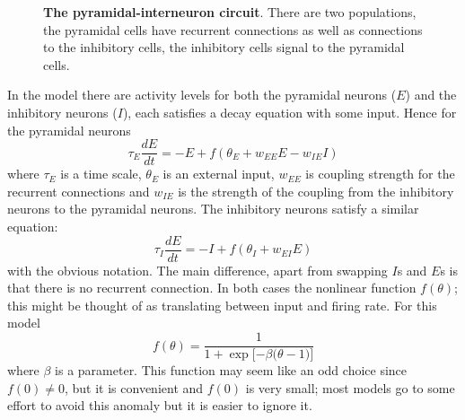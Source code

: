 \documentclass[11pt,a4paper]{scrartcl}
\begin{document}
\begin{figure}
  \begin{center}
  \end{center}
  \caption{\textbf{The pyramidal-interneuron circuit}. There are two
    populations, the pyramidal cells have recurrent connections as
    well as connections to the inhibitory cells, the inhibitory cells
    signal to the pyramidal cells.}
  \label{fig:circuit}
\end{figure}

In
the model there are activity levels for both the pyramidal neurons
($E$) and the inhibitory neurons ($I$), each satisfies a decay equation with some input. Hence for the pyramidal neurons
\begin{equation}
  \tau_E\frac{dE}{dt}=-E+f(\theta_{E}+w_{EE}E-w_{IE}I)
\end{equation}
where $\tau_E$ is a time scale, $\theta_E$ is an external input, $w_{EE}$ is coupling strength
for the recurrent connections and $w_{IE}$ is the strength of the
coupling from the inhibitory neurons to the pyramidal neurons. The inhibitory neurons satisfy a similar equation:
\begin{equation}
  \tau_I\frac{dE}{dt}=-I+f(\theta_{I}+w_{EI}E)
\end{equation}
with the obvious notation. The main difference, apart from swapping
$I$s and $E$s is that there is no recurrent connection. In both cases
the nonlinear function $f(\theta)$; this might be thought of as
translating between input and firing rate. For this model
$$f(\theta)=\frac{1}{1+\exp{[-\beta(\theta-1})]}$$ where $\beta$ is a
parameter. This function may seem like an odd choice since
$f(0)\not=0$, but it is convenient and $f(0)$ is very small; most
models go to some effort to avoid this anomaly but it is easier to
ignore it.
\end{document}
